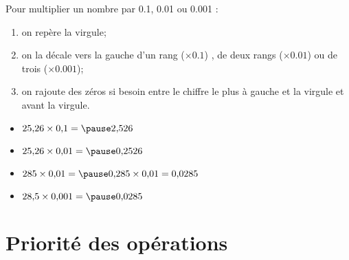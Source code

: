 \documentclass[xcolor={dvipsnames}]{beamer}
\begin{document}
\begin{frame}
	\begin{mymeth}
		
		Pour multiplier un nombre par \num{0.1}, \num{0.01} ou \num{0.001} :\pause
		
		\begin{enumerate}%
			\item on repère la virgule; \pause
			\item on la décale vers la gauche d'un rang ($\times \num{0.1}$) \pause , de deux rangs ($\times \num{0.01}$) ou de trois ($\times \num{0.001}$); \pause
			\item on rajoute des zéros si besoin entre \pause le chiffre le plus à gauche et \pause la virgule et avant la virgule. \pause
		\end{enumerate}
		
	\end{mymeth}
	
	\begin{myexs}
		
		\begin{itemize}
			
			\item $\num{25.26} \times \num{0.1} = \pause \num{2.526}$ 
			\item $\num{25.26} \times \num{0.01} = \pause \num{0.2526}$
			\item $\num{285} \times \num{0.01} = \pause \num{0.285} \times \num{0.01}= \num{0.0285}$ 
			\item $\num{28.5} \times \num{0.001} =\pause  \num{0.0285}$ 
			
		\end{itemize}	
		
		
	\end{myexs}
\end{frame}

\section{Priorité des opérations}
\end{document}
